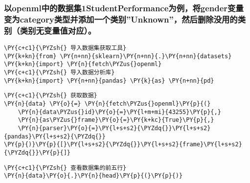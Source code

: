     \hypertarget{ux4ee5openmlux4e2dux7684ux6570ux636eux96c61studentperformanceux4e3aux4f8bux5c06genderux53d8ux91cfux53d8ux4e3acategoryux7c7bux578bux5e76ux6dfbux52a0ux4e00ux4e2aux7c7bux522bunknownux7136ux540eux5220ux9664ux6ca1ux7528ux7684ux7c7bux522bux7c7bux522bux65e0ux53d8ux91cfux503cux5bf9ux5e94}{%
\subsubsection{以openml中的数据集1StudentPerformance为例，将gender变量变为category类型并添加一个类别''Unknown''，然后删除没用的类别（类别无变量值对应）。}\label{ux4ee5openmlux4e2dux7684ux6570ux636eux96c61studentperformanceux4e3aux4f8bux5c06genderux53d8ux91cfux53d8ux4e3acategoryux7c7bux578bux5e76ux6dfbux52a0ux4e00ux4e2aux7c7bux522bunknownux7136ux540eux5220ux9664ux6ca1ux7528ux7684ux7c7bux522bux7c7bux522bux65e0ux53d8ux91cfux503cux5bf9ux5e94}}

    \begin{tcolorbox}[breakable, size=fbox, boxrule=1pt, pad at break*=1mm,colback=cellbackground, colframe=cellborder]
\begin{Verbatim}[commandchars=\\\{\}]
\PY{c+c1}{\PYZsh{} 导入数据集获取工具}
\PY{k+kn}{from} \PY{n+nn}{sklearn}\PY{n+nn}{.}\PY{n+nn}{datasets} \PY{k+kn}{import} \PY{n}{fetch\PYZus{}openml}
\PY{c+c1}{\PYZsh{} 导入数据分析库}
\PY{k+kn}{import} \PY{n+nn}{pandas} \PY{k}{as} \PY{n+nn}{pd}
\end{Verbatim}
\end{tcolorbox}

    \begin{tcolorbox}[breakable, size=fbox, boxrule=1pt, pad at break*=1mm,colback=cellbackground, colframe=cellborder]
\begin{Verbatim}[commandchars=\\\{\}]
\PY{c+c1}{\PYZsh{} 获取数据}
\PY{n}{data} \PY{o}{=} \PY{n}{fetch\PYZus{}openml}\PY{p}{(}
    \PY{n}{data\PYZus{}id}\PY{o}{=}\PY{l+m+mi}{43255}\PY{p}{,}
    \PY{n}{as\PYZus{}frame}\PY{o}{=}\PY{k+kc}{True}\PY{p}{,}
    \PY{n}{parser}\PY{o}{=}\PY{l+s+s2}{\PYZdq{}}\PY{l+s+s2}{pandas}\PY{l+s+s2}{\PYZdq{}}
\PY{p}{)}\PY{p}{[}\PY{l+s+s2}{\PYZdq{}}\PY{l+s+s2}{frame}\PY{l+s+s2}{\PYZdq{}}\PY{p}{]}
\end{Verbatim}
\end{tcolorbox}

    \begin{tcolorbox}[breakable, size=fbox, boxrule=1pt, pad at break*=1mm,colback=cellbackground, colframe=cellborder]
\begin{Verbatim}[commandchars=\\\{\}]
\PY{c+c1}{\PYZsh{} 查看数据集的前五行}
\PY{n}{data}\PY{o}{.}\PY{n}{head}\PY{p}{(}\PY{p}{)}
\end{Verbatim}
\end{tcolorbox}

